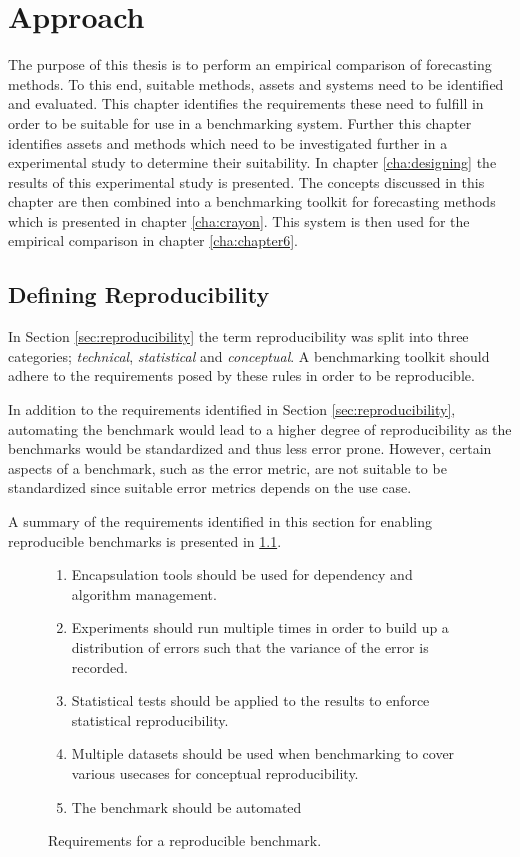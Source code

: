 \chapter{Approach}
\label{cha:approach}

The purpose of this thesis is to perform an empirical comparison of forecasting methods. To this end, suitable methods, assets and systems need to be identified and evaluated.
This chapter identifies the requirements these need to fulfill in order to be suitable for use in a benchmarking system. Further this chapter identifies assets and methods which need to be investigated further in a experimental study to determine their suitability. In chapter \ref{cha:designing} the results of this experimental study is presented. The concepts discussed in this chapter are then combined into a benchmarking toolkit for forecasting methods which is presented in chapter \ref{cha:crayon}. This system is then used for the empirical comparison in chapter \ref{cha:chapter6}.

\section{Defining Reproducibility}
In Section \ref{sec:reproducibility} the term reproducibility was split into three categories; \textit{technical}, \textit{statistical} and \textit{conceptual}. A benchmarking toolkit should adhere to the requirements posed by these rules in order to be reproducible.

In addition to the requirements identified in Section \ref{sec:reproducibility}, automating the benchmark would lead to a higher degree of reproducibility as the benchmarks would be standardized and thus less error prone. However, certain aspects of a benchmark, such as the error metric, are not suitable to be standardized since suitable error metrics depends on the use case.

A summary of the requirements identified in this section for enabling reproducible benchmarks is presented in \ref{fig:reproducibility_requirements}.

\begin{figure}[h]
  \begin{enumerate}
    \item Encapsulation tools should be used for dependency and algorithm management.
    \item Experiments should run multiple times in order to build up a distribution of errors such that the variance of the error is recorded.
    \item Statistical tests should be applied to the results to enforce statistical reproducibility.
    \item Multiple datasets should be used when benchmarking to cover various usecases for conceptual reproducibility.
    \item The benchmark should be automated
  \end{enumerate}
  \caption{Requirements for a reproducible benchmark.}
  \label{fig:reproducibility_requirements}
\end{figure}

